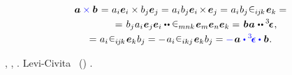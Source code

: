 \begin{multline}
\bm{a} \mathcolor{blue}{\times} \bm{b} \hspace{.2ex}
= \hspace{.1ex} a_i \bm{e}_i \times b_j \bm{e}_j
= \hspace{.1ex} a_i \hspace{.1ex} b_j \bm{e}_i \hspace{-0.2ex} \times \hspace{-0.2ex} \bm{e}_j
= \hspace{.1ex} a_i \hspace{.1ex} b_j \hspace{.1ex} \levicivita_{i\hspace{-0.1ex}j\hspace{-0.1ex}k} \hspace{.2ex} \bm{e}_k =
\\[-0.12em]
\shoveright{= \hspace{.2ex} b_j \hspace{.1ex} a_i \hspace{.1ex} \bm{e}_j \bm{e}_i \dotdotp \levicivita_{mnk} \hspace{.2ex} \bm{e}_m \bm{e}_n \bm{e}_k
= \hspace{.2ex} \bm{b} \hspace{.1ex} \bm{a} \hspace{.1ex} \dotdotp \levicivitatensor \hspace{.1ex} ,}
\\[-0.1em]
= \hspace{.1ex} a_i \hspace{.1ex} \levicivita_{i\hspace{-0.1ex}j\hspace{-0.1ex}k} \hspace{.2ex} \bm{e}_k \hspace{.1ex} b_j
= - \hspace{.2ex} a_i \hspace{.1ex} \levicivita_{ikj} \hspace{.2ex} \bm{e}_k \hspace{.1ex} b_j
= \mathcolor{blue}{-} \hspace{.2ex} \bm{a} \hspace{.1ex} \mathcolor{blue}{\dotp \levicivitatensor \dotp} \hspace{.12ex} \bm{b}
\hspace{.1ex} .
\end{multline}

\vspace{-0.1em}\noindent
{},   , .
  Levi\hbox{-}Civita   ~()    .

